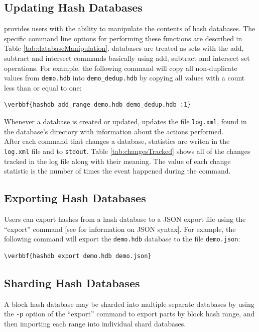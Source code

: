\documentclass[11pt,fleqn]{article} %
\begin{document}
\subsection{Updating Hash Databases}
\label{updateSection}
\hdb provides users with the ability to manipulate the contents of hash databases. The specific command line options for performing these functions are described in Table \ref{tab:databaseManipulation}. \hdb databases are treated as sets with the add, subtract and intersect commands basically using add, subtract and intersect set operations. For example, the following command will copy all non-duplicate values from \texttt{demo.hdb} into \texttt{demo\_dedup.hdb} by copying all values with a count less than or equal to one:
\begin{Verbatim}[commandchars=\\\{\}]
\verbbf{hashdb add_range demo.hdb demo_dedup.hdb :1}
\end{Verbatim}
Whenever a database is created or updated, \hdb updates the file \texttt{log.xml}, found in the database's directory with information about the actions performed.\\

After each command that changes a database, statistics are writen in the \texttt{log.xml} file and to \texttt{stdout}. Table \ref{tab:changesTracked} shows all of the changes tracked in the log file along with their meaning. The value of each change statistic is the number of times the event happened during the command.\\


\subsection{Exporting Hash Databases}
Users can export hashes from a hash database to a JSON export file using the ``export'' command [see \textbf{} for information on JSON syntax].  For example, the following command will export the \texttt{demo.hdb} database to the file \texttt{demo.json}:
\begin{Verbatim}[commandchars=\\\{\}]
\verbbf{hashdb export demo.hdb demo.json}
\end{Verbatim}

\subsection{Sharding Hash Databases}
A block hash database may be sharded into multiple separate databases by using the \verb+-p+ option of the ``export'' command to export parts by block hash range, and then importing each range into individual shard databases.
\end{document}
